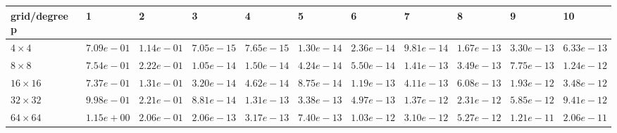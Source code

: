 \begin{tabular}{lllllllllll}
\hline
 grid/degree p   & 1          & 2          & 3          & 4          & 5          & 6          & 7          & 8          & 9          & 10         \\
\hline
 $4 \times 4$    & $7.09e-01$ & $1.14e-01$ & $7.05e-15$ & $7.65e-15$ & $1.30e-14$ & $2.36e-14$ & $9.81e-14$ & $1.67e-13$ & $3.30e-13$ & $6.33e-13$ \\
 $8 \times 8$    & $7.54e-01$ & $2.22e-01$ & $1.05e-14$ & $1.50e-14$ & $4.24e-14$ & $5.50e-14$ & $1.41e-13$ & $3.49e-13$ & $7.75e-13$ & $1.24e-12$ \\
 $16 \times 16$  & $7.37e-01$ & $1.31e-01$ & $3.20e-14$ & $4.62e-14$ & $8.75e-14$ & $1.19e-13$ & $4.11e-13$ & $6.08e-13$ & $1.93e-12$ & $3.48e-12$ \\
 $32 \times 32$  & $9.98e-01$ & $2.21e-01$ & $8.81e-14$ & $1.31e-13$ & $3.38e-13$ & $4.97e-13$ & $1.37e-12$ & $2.31e-12$ & $5.85e-12$ & $9.41e-12$ \\
 $64 \times 64$  & $1.15e+00$ & $2.06e-01$ & $2.06e-13$ & $3.17e-13$ & $7.40e-13$ & $1.03e-12$ & $3.10e-12$ & $5.27e-12$ & $1.21e-11$ & $2.06e-11$ \\
\hline
\end{tabular}